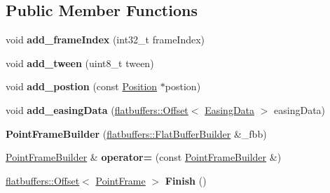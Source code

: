 \subsection*{Public Member Functions}
\begin{DoxyCompactItemize}
\item 
\mbox{\label{structflatbuffers_1_1PointFrameBuilder_a1d9c36bb5fec08e9b91d39cfe88c9674}} 
void {\bfseries add\+\_\+frame\+Index} (int32\+\_\+t frame\+Index)
\item 
\mbox{\label{structflatbuffers_1_1PointFrameBuilder_ad2787374204b91fe88d57b94f2524202}} 
void {\bfseries add\+\_\+tween} (uint8\+\_\+t tween)
\item 
\mbox{\label{structflatbuffers_1_1PointFrameBuilder_a1aa1c87a60018996f7ed38f216a74b33}} 
void {\bfseries add\+\_\+postion} (const \hyperlink{structPosition}{Position} $\ast$postion)
\item 
\mbox{\label{structflatbuffers_1_1PointFrameBuilder_a6c11fd3141a497b7f29e08a5294a3e95}} 
void {\bfseries add\+\_\+easing\+Data} (\hyperlink{structflatbuffers_1_1Offset}{flatbuffers\+::\+Offset}$<$ \hyperlink{structflatbuffers_1_1EasingData}{Easing\+Data} $>$ easing\+Data)
\item 
\mbox{\label{structflatbuffers_1_1PointFrameBuilder_ac06b596ad590fc01bdedfa25620176a3}} 
{\bfseries Point\+Frame\+Builder} (\hyperlink{classflatbuffers_1_1FlatBufferBuilder}{flatbuffers\+::\+Flat\+Buffer\+Builder} \&\+\_\+fbb)
\item 
\mbox{\label{structflatbuffers_1_1PointFrameBuilder_af5b79cdc91cd30a70b787f8aa787d1ef}} 
\hyperlink{structflatbuffers_1_1PointFrameBuilder}{Point\+Frame\+Builder} \& {\bfseries operator=} (const \hyperlink{structflatbuffers_1_1PointFrameBuilder}{Point\+Frame\+Builder} \&)
\item 
\mbox{\label{structflatbuffers_1_1PointFrameBuilder_a33aef226b2f1f0db3de5d24792491fbb}} 
\hyperlink{structflatbuffers_1_1Offset}{flatbuffers\+::\+Offset}$<$ \hyperlink{structflatbuffers_1_1PointFrame}{Point\+Frame} $>$ {\bfseries Finish} ()

\end{DoxyCompactItemize}
